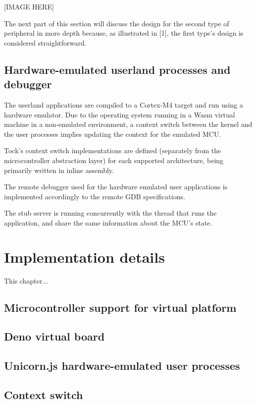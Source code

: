 \documentclass[12pt,a4paper]{report}
\begin{document}
[IMAGE HERE]

The next part of this section will discuss the design for the second type of peripheral in more depth because, as illustrated in [1], the first type's design is considered straightforward.

\section{Hardware-emulated userland processes and debugger}

The userland applications are compiled to a Cortex-M4 target and run using a hardware emulator. Due to the operating system running in a Wasm virtual machine in a non-emulated environment, a context switch between the kernel and the user processes implies updating the context for the emulated MCU.

Tock's context switch implementations are defined (separately from the microcontroller abstraction layer) for each supported architecture, being primarily written in inline assembly.

The remote debugger used for the hardware emulated user applications is implemented accordingly to the remote GDB specifications.

The stub server is running concurrently with the thread that runs the application, and share the
same information about the MCU's state.

\chapter{Implementation details}

This chapter...

\section{Microcontroller support for virtual platform}

\section{Deno virtual board}

\section{Unicorn.js hardware-emulated user processes}

\section{Context switch}
\end{document}
